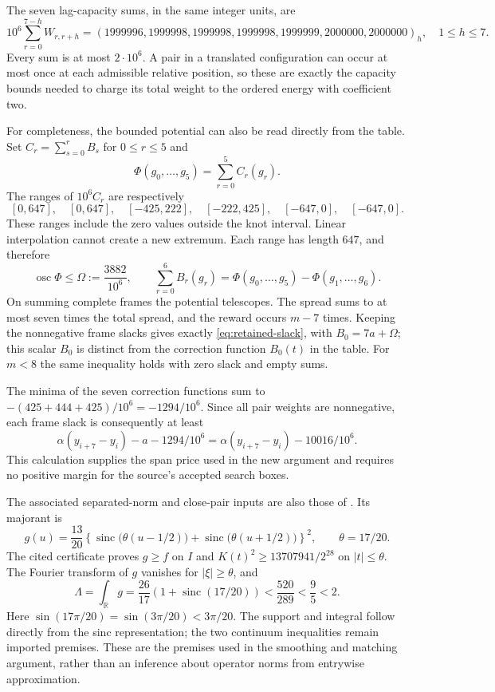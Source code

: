 \documentclass[11pt,reqno]{amsart}
\numberwithin{equation}{section}
\newcommand{\R}{\mathbb R}
\newcommand{\sinc}{\operatorname{sinc}}
\newcommand{\osc}{\operatorname{osc}}
\begin{document}
The seven lag-capacity sums, in the same integer units, are
\begin{equation}
 10^6\sum_{r=0}^{7-h}W_{r,r+h}
 =(1999996,1999998,1999998,1999998,1999999,2000000,2000000)_h,
 \quad 1\le h\le7.
 \label{eq:appendix-capacities}
\end{equation}
Every sum is at most $2\cdot10^6$. A pair in a translated configuration
can occur at most once at each admissible relative position, so these
are exactly the capacity bounds needed to charge its total weight to
the ordered energy with coefficient two.

For completeness, the bounded potential can also be read directly from
the table. Set $C_r=\sum_{s=0}^rB_s$ for $0\le r\le5$ and
\[
 \Phi(g_0,\ldots,g_5)=\sum_{r=0}^5C_r(g_r).
\]
The ranges of $10^6C_r$ are respectively
\[
 [0,647],\quad[0,647],\quad[-425,222],\quad[-222,425],
 \quad[-647,0],\quad[-647,0].
\]
These ranges include the zero values outside the knot interval.
Linear interpolation cannot create a new extremum. Each range has
length $647$, and therefore
\begin{equation}
 \osc\Phi\le\Omega:=\frac{3882}{10^6},\qquad
 \sum_{r=0}^6B_r(g_r)
 =\Phi(g_0,\ldots,g_5)-\Phi(g_1,\ldots,g_6).
 \label{eq:appendix-potential}
\end{equation}
On summing complete frames the potential telescopes. The spread sums
to at most seven times the total spread, and the reward occurs $m-7$
times. Keeping the nonnegative frame slacks gives exactly
\eqref{eq:retained-slack}, with $B_0=7a+\Omega$; this scalar $B_0$
is distinct from the correction function $B_0(t)$ in the table.
For $m<8$ the same inequality holds with zero slack and empty sums.

The minima of the seven correction functions sum to
$-(425+444+425)/10^6=-1294/10^6$. Since all pair weights are
nonnegative, each frame slack is consequently at least
\[
 \alpha(y_{i+7}-y_i)-a-1294/10^6
 =\alpha(y_{i+7}-y_i)-10016/10^6.
\]
This calculation supplies the span price used in the new argument and
requires no positive margin for the source's accepted search boxes.

The associated separated-norm and close-pair inputs are also those of
\cite[Section 5]{Knausgard2026}. Its majorant is
\[
 g(u)=\frac{13}{20}
 \left\{\sinc\bigl(\theta(u-1/2)\bigr)
       +\sinc\bigl(\theta(u+1/2)\bigr)\right\}^2,
 \qquad\theta=17/20.
\]
The cited certificate proves $g\ge f$ on $I$ and
$K(t)^2\ge13707941/2^{28}$ on $|t|\le\theta$.
The Fourier transform of $g$ vanishes for $|\xi|\ge\theta$, and
\[
 \Lambda=\int_{\R}g
 =\frac{26}{17}(1+\sinc(17/20))<\frac{520}{289}<\frac95<2.
\]
Here $\sin(17\pi/20)=\sin(3\pi/20)<3\pi/20$.
The support and integral follow directly from the sinc representation;
the two continuum inequalities remain imported premises. These are the
premises used in the smoothing and matching argument, rather than an
inference about operator norms from entrywise approximation.
\end{document}
